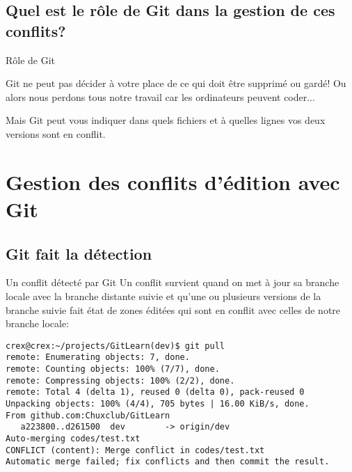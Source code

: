 \documentclass{beamer}
\begin{document}
\subsection{Quel est le rôle de Git dans la gestion de ces conflits?}
\begin{frame}{Rôle de Git}

Git ne peut pas décider à votre place de ce qui doit être supprimé ou gardé! Ou alors nous perdons tous notre travail car les ordinateurs peuvent coder...\\
\medskip

Mais Git peut vous indiquer dans quels fichiers et à quelles lignes vos deux versions sont en conflit. 
    
\end{frame}



\section{Gestion des conflits d'édition avec Git}


\subsection{Git fait la détection}

\begin{frame}[fragile]{Un conflit détecté par Git}
Un conflit survient quand on met à jour sa branche locale avec la branche distante suivie et qu'une ou plusieurs versions de la branche suivie fait état de zones éditées qui sont en conflit avec celles de notre branche locale:
\begin{mdframed}[style=Bash]
\begin{lstlisting}[style=Bash, caption={Exemple de détection automatique de conflit d'édition}]
crex@crex:~/projects/GitLearn(dev)$ git pull
remote: Enumerating objects: 7, done.
remote: Counting objects: 100% (7/7), done.
remote: Compressing objects: 100% (2/2), done.
remote: Total 4 (delta 1), reused 0 (delta 0), pack-reused 0
Unpacking objects: 100% (4/4), 705 bytes | 16.00 KiB/s, done.
From github.com:Chuxclub/GitLearn
   a223800..d261500  dev        -> origin/dev
Auto-merging codes/test.txt
CONFLICT (content): Merge conflict in codes/test.txt
Automatic merge failed; fix conflicts and then commit the result.
\end{lstlisting}
\end{mdframed}
\end{frame}
\end{document}

